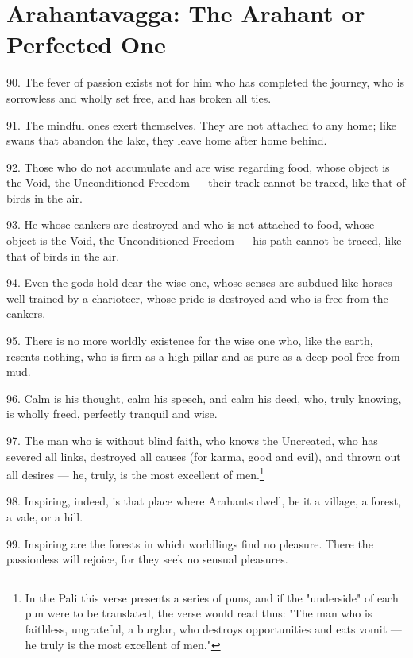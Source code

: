 \newpage
\chapter{Arahantavagga: The Arahant or Perfected One}

90. The fever of passion exists not for him who has completed the journey, who is sorrowless and wholly set free, and has broken all ties.

91. The mindful ones exert themselves. They are not attached to any home; like swans that abandon the lake, they leave home after home behind.

92. Those who do not accumulate and are wise regarding food, whose object is the Void, the Unconditioned Freedom — their track cannot be traced, like that of birds in the air.

93. He whose cankers are destroyed and who is not attached to food, whose object is the Void, the Unconditioned Freedom — his path cannot be traced, like that of birds in the air.

94. Even the gods hold dear the wise one, whose senses are subdued like horses well trained by a charioteer, whose pride is destroyed and who is free from the cankers.

95. There is no more worldly existence for the wise one who, like the earth, resents nothing, who is firm as a high pillar and as pure as a deep pool free from mud.

96. Calm is his thought, calm his speech, and calm his deed, who, truly knowing, is wholly freed, perfectly tranquil and wise.

97. The man who is without blind faith, who knows the Uncreated, who has severed all links, destroyed all causes (for karma, good and evil), and thrown out all desires — he, truly, is the most excellent of men.\footnote{In the Pali this verse presents a series of puns, and if the "underside" of each pun were to be translated, the verse would read thus: "The man who is faithless, ungrateful, a burglar, who destroys opportunities and eats vomit — he truly is the most excellent of men."}

98. Inspiring, indeed, is that place where Arahants dwell, be it a village, a forest, a vale, or a hill.

99. Inspiring are the forests in which worldlings find no pleasure. There the passionless will rejoice, for they seek no sensual pleasures.
